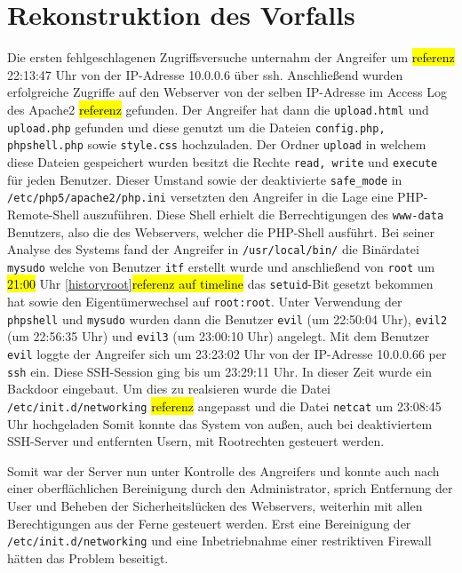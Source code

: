 \section{Rekonstruktion des Vorfalls}
Die ersten fehlgeschlagenen Zugriffsversuche unternahm der Angreifer um \hl{referenz} 22:13:47 Uhr von der IP-Adresse 10.0.0.6 über ssh.
Anschließend wurden erfolgreiche Zugriffe auf den Webserver von der selben IP-Adresse im Access Log des Apache2 \hl{referenz} gefunden.
Der Angreifer hat dann die \texttt{upload.html} und \texttt{upload.php} gefunden und diese genutzt um die Dateien \texttt{config.php, phpshell.php} sowie \texttt{style.css} hochzuladen. Der Ordner \linebreak \texttt{upload} in welchem diese Dateien gespeichert wurden besitzt die Rechte \texttt{read, write} und \texttt{execute} für jeden Benutzer. 
Dieser Umstand sowie der deaktivierte \texttt{safe\_mode} in \texttt{/etc/php5/apache2/php.ini} versetzten den \linebreak Angreifer in die Lage eine PHP-Remote-Shell auszuführen.
Diese Shell erhielt die Berrechtigungen des \texttt{www-data} Benutzers, also die des Webservers, welcher die PHP-Shell ausführt.
Bei seiner Analyse des Systems fand der Angreifer in \texttt{/usr/local/bin/} die Binärdatei \texttt{mysudo} welche von Benutzer \texttt{itf} erstellt wurde und anschließend von \texttt{root} um \hl{21:00} Uhr \ref{historyroot}\hl{referenz auf timeline} das \texttt{setuid}-Bit gesetzt bekommen hat sowie den Eigentümerwechsel auf \texttt{root:root}.
Unter Verwendung der \texttt{phpshell} und \texttt{mysudo} wurden dann die Benutzer \texttt{evil} (um 22:50:04 Uhr), \texttt{evil2} (um 22:56:35 Uhr) und \texttt{evil3} (um 23:00:10 Uhr) angelegt. Mit dem Benutzer \texttt{evil} loggte der Angreifer sich um 23:23:02 Uhr von der IP-Adresse 10.0.0.66 per \texttt{ssh} ein. Diese SSH-Session ging bis um 23:29:11 Uhr. In dieser Zeit wurde ein Backdoor eingebaut. Um dies zu realsieren wurde die Datei \texttt{/etc/init.d/networking} \hl{referenz} angepasst und die Datei \texttt{netcat} um 23:08:45 Uhr hochgeladen Somit konnte das System von außen, auch bei deaktiviertem SSH-Server und entfernten Usern, mit Rootrechten gesteuert werden.

Somit war der Server nun unter Kontrolle des Angreifers und konnte auch nach einer oberflächlichen Bereinigung durch den Administrator, sprich Entfernung der User und Beheben der Sicherheitslücken des Webservers, weiterhin mit allen Berechtigungen aus der Ferne gesteuert werden. Erst eine Bereinigung der \texttt{/etc/init.d/networking} und eine Inbetriebnahme einer restriktiven Firewall hätten das Problem beseitigt.